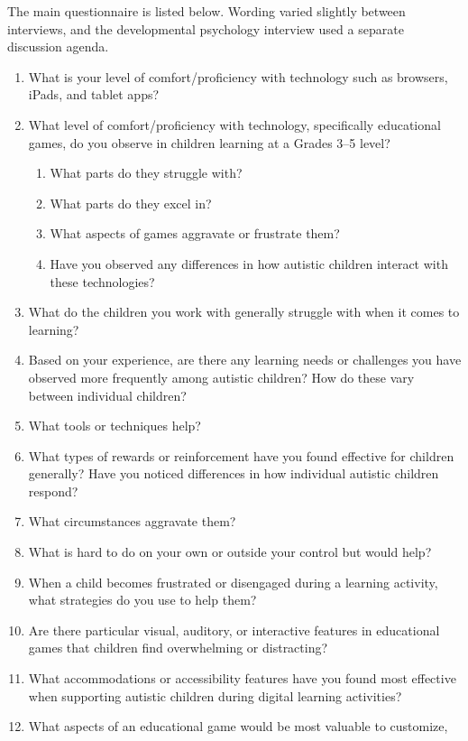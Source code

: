 \documentclass[12pt, titlepage]{article}
\begin{document}
The main questionnaire is listed below. Wording varied slightly between
interviews, and the developmental psychology interview used a separate
discussion agenda.

\begin{enumerate}
\item What is your level of comfort/proficiency with technology such as
  browsers, iPads, and tablet apps?
\item What level of comfort/proficiency with technology, specifically
  educational games, do you observe in children learning at a Grades 3--5 level?
  \begin{enumerate}
  \item What parts do they struggle with?
  \item What parts do they excel in?
  \item What aspects of games aggravate or frustrate them?
  \item Have you observed any differences in how autistic children interact
    with these technologies?
  \end{enumerate}
\item What do the children you work with generally struggle with when it comes
  to learning?
\item Based on your experience, are there any learning needs or challenges you
  have observed more frequently among autistic children? How do these vary
  between individual children?
\item What tools or techniques help?
\item What types of rewards or reinforcement have you found effective for
  children generally? Have you noticed differences in how individual autistic
  children respond?
\item What circumstances aggravate them?
\item What is hard to do on your own or outside your control but would help?
\item When a child becomes frustrated or disengaged during a learning activity,
  what strategies do you use to help them?
\item Are there particular visual, auditory, or interactive features in
  educational games that children find overwhelming or distracting?
\item What accommodations or accessibility features have you found most
  effective when supporting autistic children during digital learning
  activities?
\item What aspects of an educational game would be most valuable to customize,

\end{enumerate}
\end{document}
